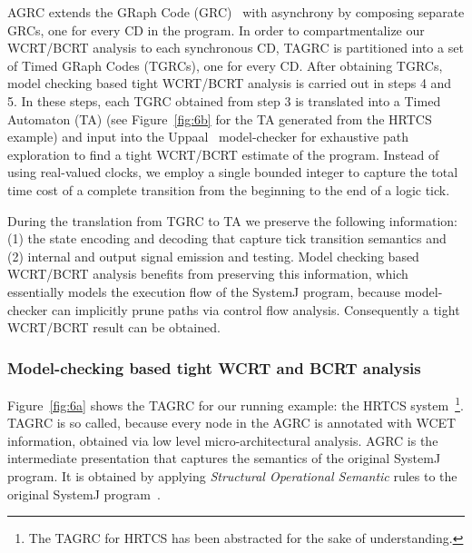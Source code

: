 AGRC extends the GRaph Code (GRC)~\cite{pbat07} with asynchrony by
composing separate GRCs, one for every CD in the program. In order to
compartmentalize our WCRT/BCRT analysis to each synchronous CD, TAGRC is
partitioned into a set of Timed GRaph Codes (TGRCs), one for every
CD. After obtaining TGRCs, model checking based tight WCRT/BCRT analysis
is carried out in steps 4 and 5. In these steps, each TGRC obtained from
step 3 is translated into a Timed Automaton (TA) (see
Figure~\ref{fig:6b} for the TA generated from the HRTCS example) and
input into the Uppaal~\cite{gbeh04} model-checker for exhaustive path
exploration to find a tight WCRT/BCRT estimate of the program. Instead
of using real-valued clocks, we employ a single bounded integer to
capture the total time cost of a complete transition from the beginning
to the end of a logic tick.

During the translation from TGRC to TA we preserve the following
information: (1) the state encoding and decoding that capture tick
transition semantics and (2) internal and output signal emission and
testing. Model checking based WCRT/BCRT analysis benefits from
preserving this information, which essentially models the execution flow
of the SystemJ program, because model-checker can implicitly prune paths
via control flow analysis. Consequently a tight WCRT/BCRT result can be
obtained. %

\subsubsection{Model-checking based tight WCRT and BCRT analysis}
\label{sec:model-checking-based}

Figure~\ref{fig:6a} shows the TAGRC for our running example: the HRTCS
system~\footnote{The TAGRC for HRTCS has been abstracted for the sake of
  understanding.}. TAGRC is so called, because every node in the AGRC is
annotated with WCET information, obtained via low level
micro-architectural analysis. AGRC is the intermediate presentation that
captures the semantics of the original SystemJ program. It is obtained
by applying \textit{Structural Operational Semantic} rules to the
original SystemJ program~\cite{amal10}.

